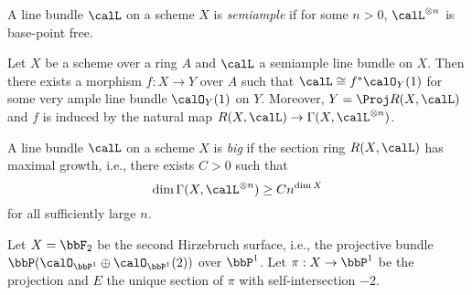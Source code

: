     \begin{definition}\label{def:semiample_line_bundle}
        A line bundle \(\calL\) on a scheme \(X\) is \emph{semiample} if for some \(n>0\), \(\calL^{\otimes n}\) is base-point free.
    \end{definition}

    \begin{theorem}\label{thm:fibration_associated_to_semiample_line_bundle}
        Let \(X\) be a scheme over a ring \(A\) and \(\calL\) a semiample line bundle on \(X\).
        Then there exists a morphism \(f:X\to Y\) over \(A\) such that \(\calL\cong f^*\calO_Y(1)\) for some very ample line bundle \(\calO_Y(1)\) on \(Y\).
        Moreover, \(Y=\Proj R(X,\calL)\) and \(f\) is induced by the natural map \(R(X,\calL)\to \Gamma(X,\calL^{\otimes n})\).
        
    \end{theorem}

    \begin{definition}\label{def:big_line_bundle}
        A line bundle \(\calL\) on a scheme \(X\) is \emph{big} if the section ring \(R(X,\calL)\) has maximal growth, i.e., there exists \(C>0\) such that
        \[
            \dim \Gamma(X,\calL^{\otimes n}) \ge C n^{\dim X}
        \]
        for all sufficiently large \(n\).
    \end{definition}

    \begin{example}\label{eg:base_locus_-K_of_Hirzebruch_surface}
        Let \(X=\bbF_2\) be the second Hirzebruch surface, i.e., the projective bundle \(\bbP(\calO_{\bbP^1}\oplus \calO_{\bbP^1}(2))\) over \(\bbP^1\).
        Let \(\pi:X\to \bbP^1\) be the projection and \(E\) the unique section of \(\pi\) with self-intersection \(-2\).
    \end{example}

